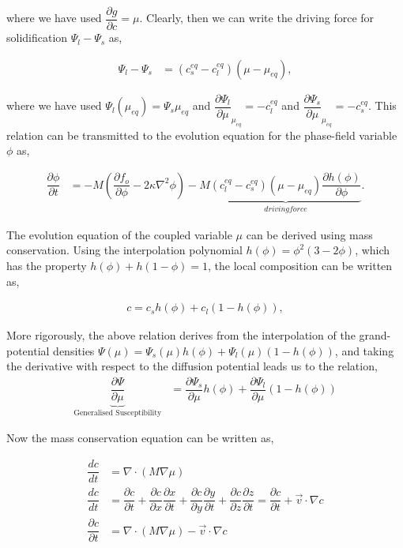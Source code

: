 \documentclass[12pt,a4paper]{report}
\begin{document}
  where we have used $\dfrac{\partial g}{\partial c}=\mu$. Clearly, then we can write 
  the driving force for solidification $\Psi_l-\Psi_s$ as,
  
  \begin{align}
   \Psi_l-\Psi_s &= (c_s^{eq} - c_l^{eq})\left(\mu-\mu_{eq}\right),
  \end{align}
  
  where we have used $\Psi_l\left(\mu_{eq}\right) = \Psi_s{\mu_{eq}}$ and $\dfrac{\partial \Psi_l}{\partial \mu}_{\mu_{eq}} = -c_l^{eq}$
  and $\dfrac{\partial \Psi_s}{\partial \mu}_{\mu_{eq}} = -c_s^{eq}$. This relation can be 
  transmitted to the evolution equation for the phase-field variable $\phi$ as,
  
  \begin{align}
  \dfrac{\partial \phi}{\partial t} &= -M \left(\dfrac{\partial f_o}{\partial \phi} - 2\kappa\nabla^{2}\phi\right)  
					-M\underbrace{(c_l^{eq} - c_s^{eq})\left(\mu-\mu_{eq}\right)\dfrac{\partial h\left(\phi\right)}{\partial \phi}}_{driving force}.
  \end{align}

  The evolution equation of the coupled variable $\mu$ can be derived using mass conservation. 
  Using the interpolation polynomial $h(\phi) = \phi^2\left(3 - 2\phi\right)$, which has the 
  property $h(\phi) + h(1 - \phi) = 1$, the local composition can be written as, 
  
  \begin{align}
   c = c_s h\left(\phi\right) + c_l (1 - h\left(\phi\right)), 
  \end{align}
  
  More rigorously, the above relation derives from the 
  interpolation of the grand-potential densities $\Psi\left(\mu\right) = 
  \Psi_s\left(\mu\right) h\left(\phi\right) + \Psi_l\left(\mu\right) (1 - h\left(\phi\right))$,
  and taking the derivative with respect to the diffusion potential leads us to the relation, 
  \begin{align}
	\underbrace{\dfrac{\partial \Psi}{\partial \mu}}_{\text{Generalised Susceptibility}} &= \dfrac{\partial \Psi_s}{\partial \mu} h\left(\phi\right) 
  + \dfrac{\partial \Psi_l}{\partial \mu} (1-h\left(\phi\right))
	\end{align}
 
 Now the mass conservation equation can be written as, 

\begin{align}
 \dfrac{dc}{dt} &= \nabla\cdot\left(M\nabla\mu\right)\\
	\dfrac{dc}{dt} &= \dfrac{\partial c}{\partial t} + \dfrac{\partial c}{\partial x}\dfrac{\partial x}{\partial t}
	+\dfrac{\partial c}{\partial y}\dfrac{\partial y}{\partial t}+\dfrac{\partial c}{\partial z}\dfrac{\partial z}{\partial t}
	= \dfrac{\partial c}{\partial t} + \vec{v}\cdot\nabla c\\
	\dfrac{\partial c}{\partial t} &= \nabla\cdot\left(M\nabla\mu\right) - \vec{v}\cdot\nabla c
\label{mass-conservation}
\end{align}
\end{document}
